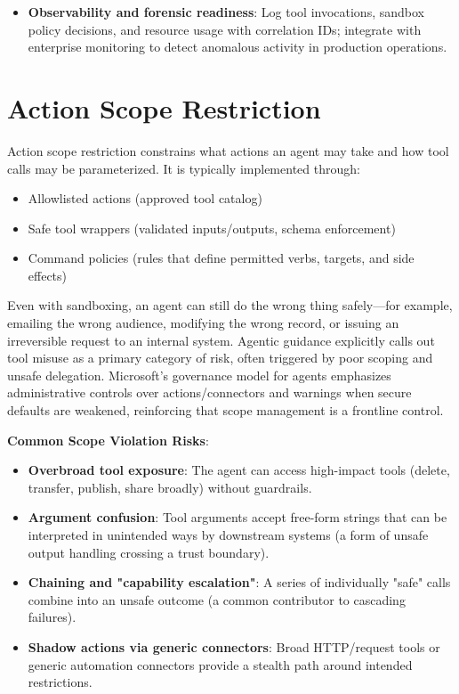 \begin{TNtwocol}
\begin{itemize}
        \item \textbf{Observability and forensic readiness}: Log tool invocations, sandbox policy decisions, and resource usage with correlation IDs; integrate with enterprise monitoring to detect anomalous activity in production operations.
    \end{itemize}

    \section{Action Scope Restriction}

    Action scope restriction constrains what actions an agent may take and how tool calls may be parameterized. It is typically implemented through:

    \begin{itemize}
        \item Allowlisted actions (approved tool catalog)
        \item Safe tool wrappers (validated inputs/outputs, schema enforcement)
        \item Command policies (rules that define permitted verbs, targets, and side effects)
    \end{itemize}

    Even with sandboxing, an agent can still do the wrong thing safely—for example, emailing the wrong audience, modifying the wrong record, or issuing an irreversible request to an internal system. Agentic guidance explicitly calls out tool misuse as a primary category of risk, often triggered by poor scoping and unsafe delegation. Microsoft's governance model for agents emphasizes administrative controls over actions/connectors and warnings when secure defaults are weakened, reinforcing that scope management is a frontline control.

    \textbf{Common Scope Violation Risks}:

    \begin{itemize}
        \item \textbf{Overbroad tool exposure}: The agent can access high-impact tools (delete, transfer, publish, share broadly) without guardrails.
        \item \textbf{Argument confusion}: Tool arguments accept free-form strings that can be interpreted in unintended ways by downstream systems (a form of unsafe output handling crossing a trust boundary).
        \item \textbf{Chaining and "capability escalation"}: A series of individually "safe" calls combine into an unsafe outcome (a common contributor to cascading failures).
        \item \textbf{Shadow actions via generic connectors}: Broad HTTP/request tools or generic automation connectors provide a stealth path around intended restrictions.
    \end{itemize}


\end{TNtwocol}
